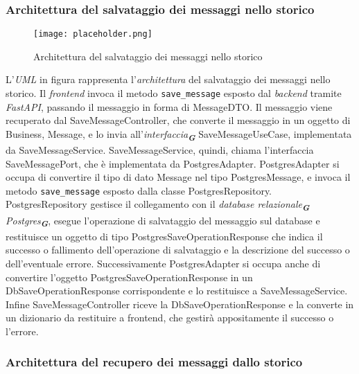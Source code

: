 \newpage


\subsubsection{Architettura del salvataggio dei messaggi nello storico}
\label{sec:architettura_salvataggio_messaggi_storico}

\begin{figure}[h]
    \centering
    \texttt{[image: placeholder.png]}
    \caption{Architettura del salvataggio dei messaggi nello storico}
\end{figure}

L'\emph{UML} in figura rappresenta l'\emph{architettura} del salvataggio dei messaggi nello storico.
Il \emph{frontend} invoca il metodo \texttt{save\_message} esposto dal \emph{backend} tramite \emph{FastAPI}, passando il messaggio in forma di MessageDTO.
Il messaggio viene recuperato dal SaveMessageController, che converte il messaggio in un oggetto di Business, Message, e lo invia all'\emph{interfaccia}\textsubscript{\textbf{\textit{G}}} SaveMessageUseCase, implementata da SaveMessageService.
SaveMessageService, quindi, chiama l'interfaccia SaveMessagePort, che è implementata da PostgresAdapter.
PostgresAdapter si occupa di convertire il tipo di dato Message nel tipo PostgresMessage, e invoca il metodo \texttt{save\_message} esposto dalla classe PostgresRepository.
PostgresRepository gestisce il collegamento con il \emph{database relazionale}\textsubscript{\textbf{\textit{G}}} \emph{Postgres}\textsubscript{\textbf{\textit{G}}},
esegue l'operazione di salvataggio del messaggio sul database e restituisce un oggetto di tipo PostgresSaveOperationResponse che indica il successo o fallimento dell'operazione di salvataggio e la descrizione del successo o dell'eventuale errore.
Successivamente PostgresAdapter si occupa anche di convertire l'oggetto PostgresSaveOperationResponse in un DbSaveOperationResponse corrispondente e lo restituisce a SaveMessageService.
Infine SaveMessageController riceve la DbSaveOperationResponse e la converte in un dizionario da restituire a frontend, che gestirà appositamente il successo o l'errore.

\newpage


\subsubsection{Architettura del recupero dei messaggi dallo storico}
\label{sec:architettura_recupero_messaggi_storico}

